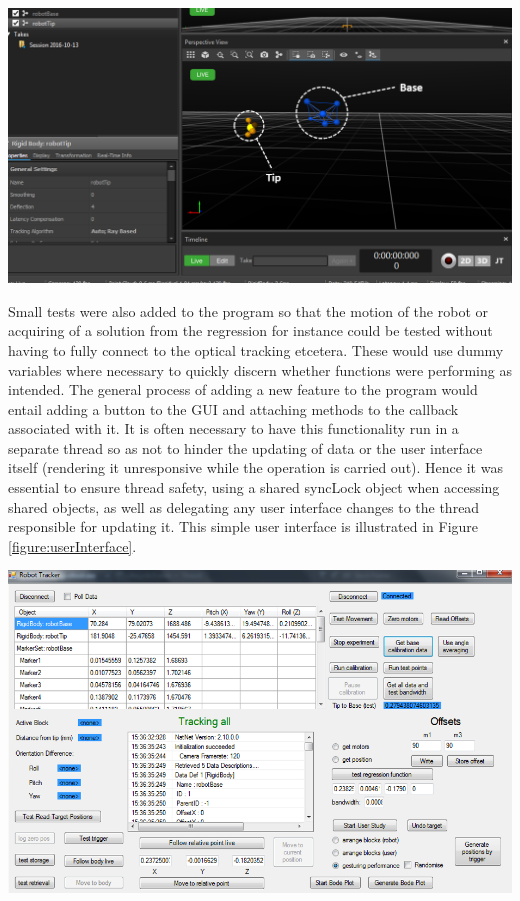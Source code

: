 \documentclass[11pt]{article}
\begin{document}
\begin{center}
\includegraphics[width=\textwidth]{images/motiveScreenshot2.png}
\label{figure:motiveInterface}
\end{center}


Small tests were also added to the program so that the motion of the robot or acquiring of a solution from the regression for instance could be tested without having to fully connect to the optical tracking etcetera. These would use dummy variables where necessary to quickly discern whether functions were performing as intended. The general process of adding a new feature to the program would entail adding a button to the GUI and attaching methods to the callback associated with it. It is often necessary to have this functionality run in a separate thread so as not to hinder the updating of data or the user interface itself (rendering it unresponsive while the operation is carried out). Hence it was essential to ensure thread safety, using a shared syncLock object when accessing shared objects, as well as delegating any user interface changes to the thread responsible for updating it. This simple user interface is illustrated in Figure \ref{figure:userInterface}.

\begin{center}
\includegraphics[width=\textwidth]{images/gui2.png}
\label{figure:userInterface}
\end{center}
\end{document}
